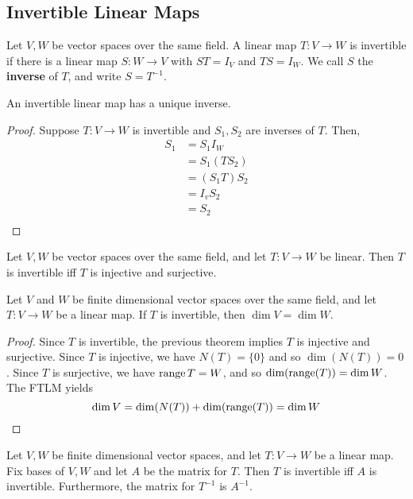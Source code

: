 \documentclass{article}
\begin{document}
\subsection{Invertible Linear Maps}
\begin{definition}
  Let $V, W$ be vector spaces over the same field. A linear map $T: V \to W$ is invertible if there is a linear map $S: W \to V$ with $ST = I_V$ and $TS = I_W$. We call $S$ the \textbf{inverse} of $T$, and write $S = T^{-1}$.
\end{definition}
\begin{theorem}
  An invertible linear map has a unique inverse.
\end{theorem}
\begin{proof}
  Suppose $T: V \to W$ is invertible and $S_1, S_2$ are inverses of $T$.
  Then,
  \begin{align*}
    S_1 &= S_1I_W\\
    &= S_1(TS_2)\\
    &= (S_1T)S_2\\
    &= I_vS_2\\
    &= S_2\\
  \end{align*}
\end{proof}
\begin{theorem}
  Let $V, W$ be vector spaces over the same field, and let $T: V \to W$ be linear. Then $T$ is invertible iff $T$ is injective and surjective.
\end{theorem}
\begin{theorem}
  Let $V$ and $W$ be finite dimensional vector spaces over the same field, and let $T: V \to W$ be a linear map. If $T$ is invertible, then $\dim V = \dim W$.
\end{theorem}
\begin{proof}
  Since $T$ is invertible, the previous theorem implies $T$ is injective and surjective. Since $T$ is injective, we have $N(T) = \{0\}$ and so $\dim(N(T)) = 0$. Since $T$ is surjective, we have $\operatorname{\text{range}} T = W$, and so $\dim(\operatorname{\text{range}}(T)) = \dim W$. The FTLM yields \[
    \dim V = \dim(N(T)) + \dim(\operatorname{\text{range}}(T)) = \dim W
  \]
\end{proof}
\begin{theorem}
  Let $V, W$ be finite dimensional vector spaces, and let $T: V \to W$ be a linear map. Fix bases of $V, W$ and let $A$ be the matrix for $T$. Then $T$ is invertible iff $A$ is invertible. Furthermore, the matrix for $T^{-1}$ is $A^{-1}$.
\end{theorem}
\end{document}
